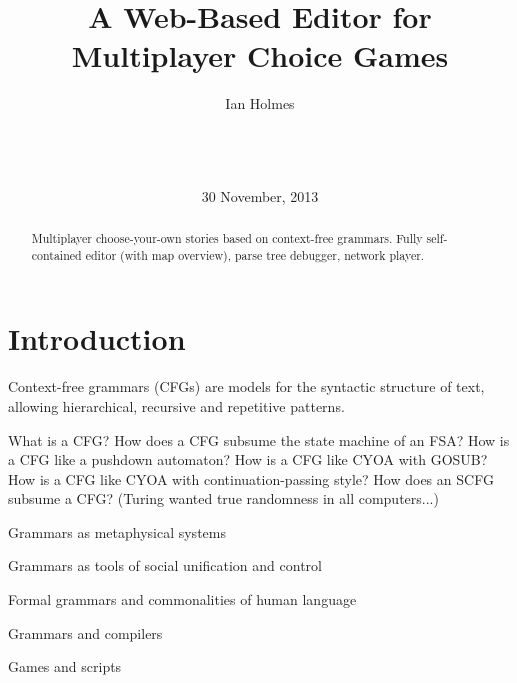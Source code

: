 \documentclass{acm_proc_article-sp}
\begin{document}
\title{A Web-Based Editor for Multiplayer Choice Games}
\author{
\alignauthor
Ian Holmes\\
       \\
       \\
       \\
}
\date{30 November, 2013}

\maketitle
\begin{abstract}
Multiplayer choose-your-own stories based on context-free grammars.
Fully self-contained editor (with map overview), parse tree debugger, network player.
\end{abstract}



\section{Introduction}

Context-free grammars (CFGs) are models for the syntactic structure of text,
allowing hierarchical, recursive and repetitive patterns.

What is a CFG?
How does a CFG subsume the state machine of an FSA?
How is a CFG like a pushdown automaton?
How is a CFG like CYOA with GOSUB?
How is a CFG like CYOA with continuation-passing style?
How does an SCFG subsume a CFG? (Turing wanted true randomness in all computers...)

\cite{DBLP:conf/icalp/EtessamiWY08}

Grammars as metaphysical systems
\cite{SanskritSutras}
\cite{Priscian}

Grammars as tools of social unification and control
\cite{AcademieFrancaise}
\cite{RobertLowth}

Formal grammars and commonalities of human language
\cite{Chomsky}

Grammars and compilers
\cite{AhoLamSethiUllmanCompilersDragonBook}

Games and scripts
\cite{EricBerneGamesPeoplePlay,EricBerneWhatDoYouSayAfterYouSayHello}
\end{document}

